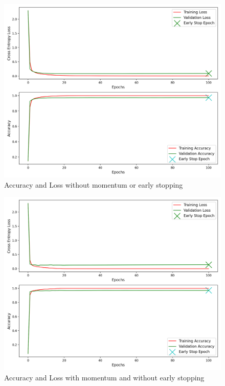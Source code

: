 \begin{figure}[!ht]
	\centering
	\includegraphics[width=1.0\textwidth]{./images/no_momentum_no_early_stop.png}
	\caption{Accuracy and Loss without momentum or early stopping}
	\label{fig:no_momentum_no_early_stop}
\end{figure}
\begin{figure}[!ht]
	\centering
	\includegraphics[width=1.0\textwidth]{./images/momentum_no_early_stop.png}
	\caption{Accuracy and Loss with momentum and without early stopping}
	\label{fig:momentum_no_early_stop}
\end{figure}

